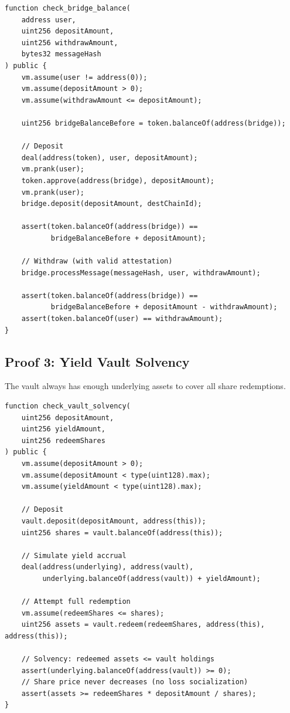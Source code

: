 \begin{lstlisting}[language=Solidity,caption={Bridge balance proof}]
function check_bridge_balance(
    address user,
    uint256 depositAmount,
    uint256 withdrawAmount,
    bytes32 messageHash
) public {
    vm.assume(user != address(0));
    vm.assume(depositAmount > 0);
    vm.assume(withdrawAmount <= depositAmount);

    uint256 bridgeBalanceBefore = token.balanceOf(address(bridge));

    // Deposit
    deal(address(token), user, depositAmount);
    vm.prank(user);
    token.approve(address(bridge), depositAmount);
    vm.prank(user);
    bridge.deposit(depositAmount, destChainId);

    assert(token.balanceOf(address(bridge)) ==
           bridgeBalanceBefore + depositAmount);

    // Withdraw (with valid attestation)
    bridge.processMessage(messageHash, user, withdrawAmount);

    assert(token.balanceOf(address(bridge)) ==
           bridgeBalanceBefore + depositAmount - withdrawAmount);
    assert(token.balanceOf(user) == withdrawAmount);
}
\end{lstlisting}

\subsection{Proof 3: Yield Vault Solvency}

The vault always has enough underlying assets to cover all share redemptions.

\begin{lstlisting}[language=Solidity,caption={Yield vault solvency proof}]
function check_vault_solvency(
    uint256 depositAmount,
    uint256 yieldAmount,
    uint256 redeemShares
) public {
    vm.assume(depositAmount > 0);
    vm.assume(depositAmount < type(uint128).max);
    vm.assume(yieldAmount < type(uint128).max);

    // Deposit
    vault.deposit(depositAmount, address(this));
    uint256 shares = vault.balanceOf(address(this));

    // Simulate yield accrual
    deal(address(underlying), address(vault),
         underlying.balanceOf(address(vault)) + yieldAmount);

    // Attempt full redemption
    vm.assume(redeemShares <= shares);
    uint256 assets = vault.redeem(redeemShares, address(this), address(this));

    // Solvency: redeemed assets <= vault holdings
    assert(underlying.balanceOf(address(vault)) >= 0);
    // Share price never decreases (no loss socialization)
    assert(assets >= redeemShares * depositAmount / shares);
}
\end{lstlisting}

